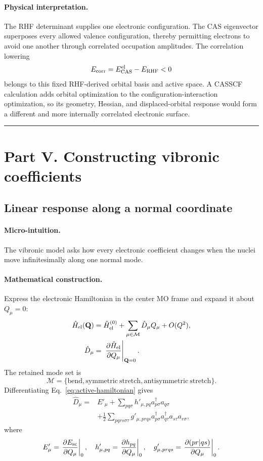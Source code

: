\documentclass[10pt,twocolumn]{article}
\newcommand{\conceptbreak}{%
  \par\medskip\noindent
  {\color{black!30}\rule{\columnwidth}{0.35pt}}%
  \par\medskip}
\newcommand{\micro}{\paragraph{Micro-intuition.}}
\newcommand{\mathderiv}{\paragraph{Mathematical construction.}}
\newcommand{\physical}{\paragraph{Physical interpretation.}}
\begin{document}
\physical The RHF determinant supplies one electronic configuration.  The CAS
eigenvector superposes every allowed valence configuration, thereby permitting
electrons to avoid one another through correlated occupation amplitudes.  The
correlation lowering
\begin{equation}
E_{\rm corr}=E_{\rm CAS}^{\rm el}-E_{\rm RHF}<0
\label{eq:correlation-energy}
\end{equation}
belongs to this fixed RHF-derived orbital basis and active space.  A CASSCF
calculation adds orbital optimization to the configuration-interaction
optimization, so its geometry, Hessian, and displaced-orbital response would
form a different and more internally correlated electronic surface.

\conceptbreak

\section*{Part V. Constructing vibronic coefficients}

\subsection*{Linear response along a normal coordinate}

\micro The vibronic model asks how every electronic coefficient changes when
the nuclei move infinitesimally along one normal mode.

\mathderiv Express the electronic Hamiltonian in the center MO frame and expand
it about $Q_\mu=0$:
\begin{align}
\hat H_{\rm el}(\mathbf Q)
={}&\hat H_{\rm el}^{(0)}
+\sum_{\mu\in\mathcal M}\hat D_\mu Q_\mu+O(Q^2),\nonumber\\
\hat D_\mu
={}&\left.\frac{\partial\hat H_{\rm el}}
{\partial Q_\mu}\right|_{\mathbf Q=0}.
\label{eq:linear-expansion}
\end{align}
The retained mode set is
\begin{equation}
\mathcal M=\{\mathrm{bend},\mathrm{symmetric\ stretch},
\mathrm{antisymmetric\ stretch}\}.
\end{equation}
Differentiating Eq.~\eqref{eq:active-hamiltonian} gives
\begin{align}
\hat D_\mu={}&E'_\mu
+\sum_{pq\sigma}h'_{\mu,pq}a_{p\sigma}^\dagger a_{q\sigma}\nonumber\\
&+\frac12\sum_{pqrs\sigma\tau}g'_{\mu,prqs}
a_{p\sigma}^\dagger a_{q\tau}^\dagger a_{s\tau}a_{r\sigma},
\label{eq:derivative-operator}
\end{align}
where
\begin{equation}
E'_\mu=\left.\frac{\partial E_{\rm sc}}{\partial Q_\mu}\right|_0,
\quad
h'_{\mu,pq}=\left.\frac{\partial h_{pq}}{\partial Q_\mu}\right|_0,
\quad
g'_{\mu,prqs}=\left.\frac{\partial(pr|qs)}{\partial Q_\mu}\right|_0.
\label{eq:coefficient-derivatives}
\end{equation}
\end{document}
